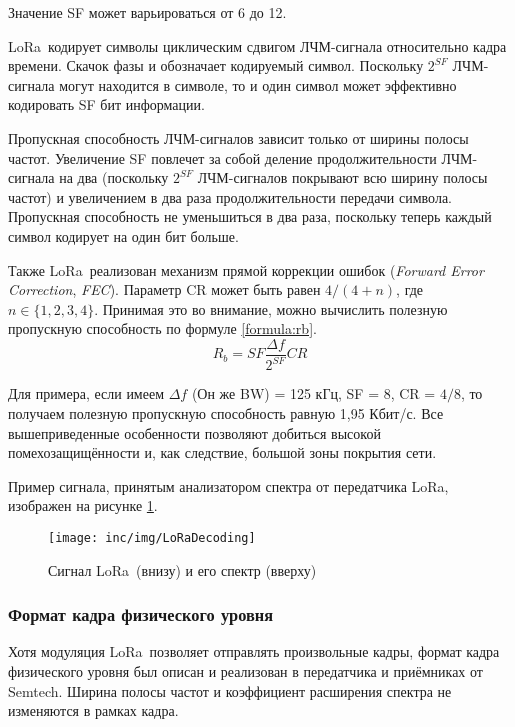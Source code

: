 Значение SF может варьироваться от 6 до 12.

LoRa\texttrademark~кодирует символы циклическим сдвигом ЛЧМ-сигнала 
относительно кадра 
времени. 
Скачок фазы и обозначает кодируемый символ.
Поскольку $2^{SF}$ ЛЧМ-сигнала могут находится в символе, то и один символ 
может эффективно кодировать SF бит информации.

Пропускная способность ЛЧМ-сигналов зависит только от ширины полосы частот.
Увеличение SF повлечет за собой деление продолжительности ЛЧМ-сигнала на два 
(поскольку $2^{SF}$ ЛЧМ-сигналов покрывают всю ширину полосы частот) и 
увеличением в два раза продолжительности передачи символа.
Пропускная способность не уменьшиться в два раза, поскольку теперь каждый 
символ 
кодирует на один бит больше.

Также LoRa\texttrademark~реализован механизм прямой коррекции ошибок 
(\textit{Forward Error 
Correction}, \textit{FEC}).
Параметр CR может быть равен $4/(4+n)$, где $n \in \{1, 2, 3, 4\}$.
Принимая это во внимание, можно вычислить полезную пропускную способность по 
формуле \ref{formula:rb}.
\begin{equation}
 R_b = SF \frac{\Delta f}{2^{SF}} CR \label{formula:rb}
\end{equation}

Для примера, если имеем $\Delta f$ (Он же BW) = 125 кГц, SF = 8, CR = $4/8$, то 
получаем полезную пропускную способность равную 1,95 Кбит/с.
Все вышеприведенные особенности позволяют добиться высокой помехозащищённости 
и, 
как следствие, большой зоны покрытия сети.

Пример сигнала, принятым анализатором спектра от передатчика 
LoRa\texttrademark, изображен на 
рисунке \ref{fig:loradecoding}.

\begin{figure}[!h]
  \centering
  \texttt{[image: inc/img/LoRaDecoding]}
  \caption{Сигнал LoRa\texttrademark~(внизу) и его спектр (вверху) 
\cite{DecodingLora2018}}
  \label{fig:loradecoding}
\end{figure}

\subsubsection{Формат кадра физического уровня}\label{part:physframe}

Хотя модуляция LoRa\texttrademark~позволяет отправлять произвольные кадры, 
формат кадра 
физического уровня был описан и реализован в передатчика и приёмниках от 
Semtech.
Ширина полосы частот и коэффициент расширения спектра не изменяются в рамках 
кадра.

